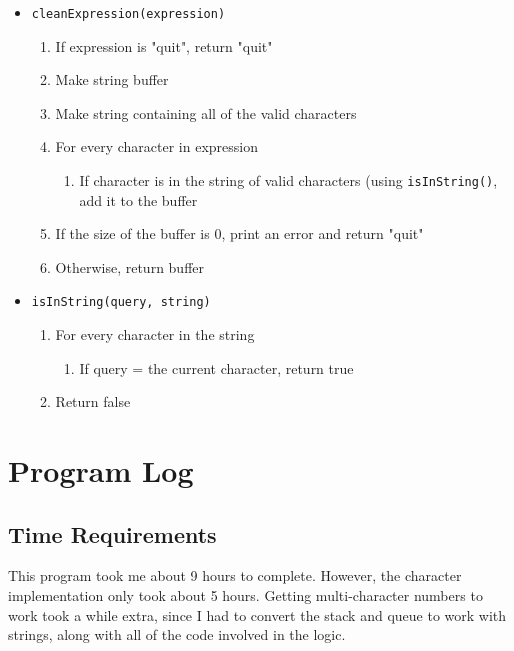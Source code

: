 \documentclass{article}
\begin{document}
\begin{itemize}
            \item{\texttt{cleanExpression(expression)}}
                \begin{enumerate}
                    \item If expression is "quit", return "quit"
                    \item Make string buffer
                    \item Make string containing all of the valid characters
                    \item For every character in expression
                        \begin{enumerate}
                            \item If character is in the string of valid characters (using \texttt{isInString()},
                            add it to the buffer
                        \end{enumerate}
                    \item If the size of the buffer is 0, print an error and return "quit"
                    \item Otherwise, return buffer
                \end{enumerate}

            \item{\texttt{isInString(query, string)}}
                \begin{enumerate}
                    \item For every character in the string
                        \begin{enumerate}
                            \item If query = the current character, return true
                        \end{enumerate}
                    \item Return false
                \end{enumerate}

                
        \end{itemize}

        

    \newpage

    
\section{Program Log}
    \subsection{Time Requirements}
    This program took me about 9 hours to complete. However, the character implementation only took about 5 hours. Getting multi-character numbers to work took a while extra, since I had to convert the stack and queue to work with strings, along with all of the code involved in the logic.
\end{document}
